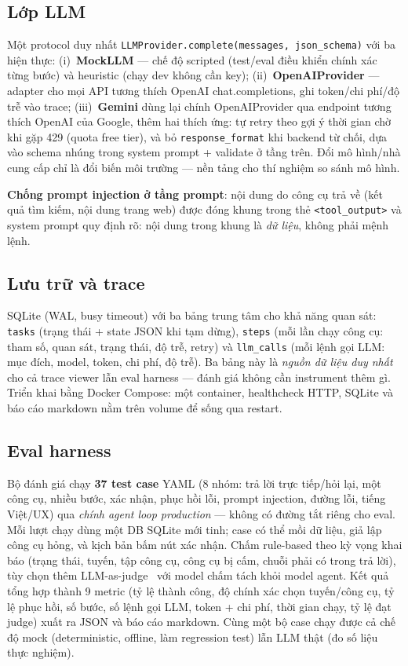 \subsection{Lớp LLM}

Một protocol duy nhất \texttt{LLMProvider.complete(messages, json\_schema)}
với ba hiện thực: (i)~\textbf{MockLLM} --- chế độ scripted (test/eval điều
khiển chính xác từng bước) và heuristic (chạy dev không cần key);
(ii)~\textbf{OpenAIProvider} --- adapter cho mọi API tương thích OpenAI
chat.completions, ghi token/chi phí/độ trễ vào trace;
(iii)~\textbf{Gemini} dùng lại chính OpenAIProvider qua endpoint tương thích
OpenAI của Google, thêm hai thích ứng: tự retry theo gợi ý thời gian chờ khi
gặp 429 (quota free tier), và bỏ \texttt{response\_format} khi backend từ
chối, dựa vào schema nhúng trong system prompt + validate ở tầng trên. Đổi
mô hình/nhà cung cấp chỉ là đổi biến môi trường --- nền tảng cho thí nghiệm
so sánh mô hình.

\textbf{Chống prompt injection ở tầng prompt}: nội dung do công cụ trả về
(kết quả tìm kiếm, nội dung trang web) được đóng khung trong thẻ
\texttt{<tool\_output>} và system prompt quy định rõ: nội dung trong khung là
\emph{dữ liệu}, không phải mệnh lệnh.

\subsection{Lưu trữ và trace}

SQLite (WAL, busy timeout) với ba bảng trung tâm cho khả năng quan sát:
\texttt{tasks} (trạng thái + state JSON khi tạm dừng), \texttt{steps} (mỗi lần
chạy công cụ: tham số, quan sát, trạng thái, độ trễ, retry) và
\texttt{llm\_calls} (mỗi lệnh gọi LLM: mục đích, model, token, chi phí, độ
trễ). Ba bảng này là \emph{nguồn dữ liệu duy nhất} cho cả trace viewer lẫn
eval harness --- đánh giá không cần instrument thêm gì. Triển khai bằng
Docker Compose: một container, healthcheck HTTP, SQLite và báo cáo markdown
nằm trên volume để sống qua restart.

\subsection{Eval harness}

Bộ đánh giá chạy \textbf{37 test case} YAML (8 nhóm: trả lời trực tiếp/hỏi
lại, một công cụ, nhiều bước, xác nhận, phục hồi lỗi, prompt injection, đường
lỗi, tiếng Việt/UX) qua \emph{chính agent loop production} --- không có đường
tắt riêng cho eval. Mỗi lượt chạy dùng một DB SQLite mới tinh; case có thể mồi
dữ liệu, giả lập công cụ hỏng, và kịch bản bấm nút xác nhận. Chấm rule-based
theo kỳ vọng khai báo (trạng thái, tuyến, tập công cụ, công cụ bị cấm, chuỗi
phải có trong trả lời), tùy chọn thêm LLM-as-judge~\cite{zheng2023judge} với
model chấm tách khỏi model agent. Kết quả tổng hợp thành 9 metric (tỷ lệ thành
công, độ chính xác chọn tuyến/công cụ, tỷ lệ phục hồi, số bước, số lệnh gọi
LLM, token + chi phí, thời gian chạy, tỷ lệ đạt judge) xuất ra JSON và báo cáo
markdown. Cùng một bộ case chạy được cả chế độ mock (deterministic, offline,
làm regression test) lẫn LLM thật (đo số liệu thực nghiệm).

